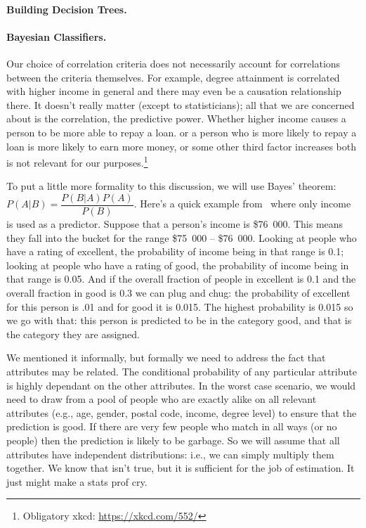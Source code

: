 \paragraph{Building Decision Trees.}

\paragraph{Bayesian Classifiers.} Our choice of correlation criteria does not necessarily account for correlations between the criteria themselves. For example, degree attainment is correlated with higher income  in general and there may even be a causation relationship there. It doesn't really matter (except to statisticians); all that we are concerned about is the correlation, the predictive power. Whether higher income causes a person to be more able to repay a loan. or a person who is more likely to repay a loan is more likely to earn more money, or some other third factor increases both is not relevant for our purposes.\footnote{Obligatory xkcd: \url{https://xkcd.com/552/} }

To put a little more formality to this discussion, we will use Bayes' theorem: $P(A|B) = \dfrac{P(B|A)P(A)}{P(B)}$. Here's a quick example  from~\cite{dsc} where only income is used as a predictor. Suppose that a person's income is \$76~000. This means they fall into the bucket for the range \$75~000 -- \$76~000. Looking at people who have a rating of excellent, the probability of income being in that range is 0.1; looking at people who have a rating of good, the probability of income being in that range is 0.05. And if the overall fraction of people in excellent is 0.1 and the overall fraction in good is 0.3 we can plug and chug: the probability of excellent for this person is .01 and for good it is 0.015. The highest probability is 0.015 so we go with that: this person is predicted to be in the category good, and that is the category they are assigned.

We mentioned it informally, but formally we need to address the fact that attributes may be related. The conditional probability of any particular attribute is highly dependant on the other attributes. In the worst case scenario, we would need to draw from a pool of people who are exactly alike on all relevant attributes (e.g., age, gender, postal code, income, degree level) to ensure that the prediction is good. If there are very few people who match in all ways (or no people) then the prediction is likely to be garbage.  So we will assume that all attributes have independent distributions: i.e., we can simply multiply them together. We know that isn't true, but it is sufficient for the job of estimation. It just might make a stats prof cry.

